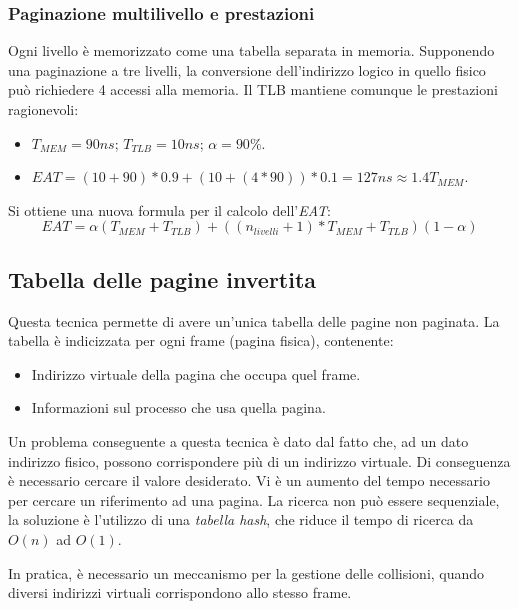 \documentclass[a4paper,12pt, twoside]{report}
\newcommand{\defbox}[1]{\noindent\colorbox{shadecolor}
{\parbox{\dimexpr\textwidth-2\fboxsep\relax}{#1}}}
\begin{document}
\subsubsection{Paginazione multilivello e prestazioni}
Ogni livello \`e memorizzato come una tabella separata in memoria. Supponendo una paginazione a tre livelli, la conversione dell'indirizzo logico in quello fisico pu\`o richiedere 4 accessi alla memoria. Il TLB 
mantiene comunque le prestazioni ragionevoli:
\begin{itemize}
    \item $T_{MEM} = 90ns$; $T_{TLB} = 10ns$; $\alpha = 90\%$.
    \item $EAT = (10 + 90) * 0.9 + (10+(4*90)) * 0.1 = 127ns \approx 1.4 T_{MEM}$.
\end{itemize}
\defbox{
Si ottiene una nuova formula per il calcolo dell'\emph{EAT}:
\[ EAT = \alpha (T_{MEM} + T_{TLB}) + ((n_{livelli}+1) * T_{MEM} + T_{TLB})(1 - \alpha)\]
}

\subsection{Tabella delle pagine invertita}

Questa tecnica permette di avere un'unica tabella delle pagine non paginata. La tabella \`e indicizzata per
ogni frame (pagina fisica), contenente:
\begin{itemize}
    \item Indirizzo virtuale della pagina che occupa quel frame.
    \item Informazioni sul processo che usa quella pagina.
\end{itemize}

Un problema conseguente a questa tecnica \`e dato dal fatto che, ad un dato indirizzo fisico, possono 
corrispondere pi\`u di un indirizzo virtuale. Di conseguenza \`e necessario cercare il valore desiderato. 
Vi \`e un aumento del tempo necessario per cercare un riferimento ad una pagina.
La ricerca non pu\`o essere sequenziale, la soluzione \`e l'utilizzo di una \emph{tabella hash}, che riduce
il tempo di ricerca da $O(n)$ ad $O(1)$.

In pratica, \`e necessario un meccanismo per la gestione delle collisioni, quando diversi indirizzi 
virtuali corrispondono allo stesso frame.
\end{document}
